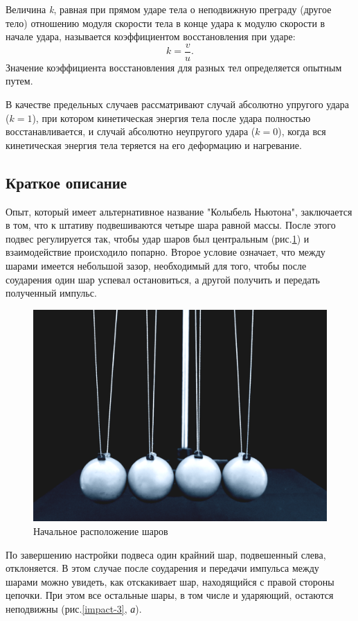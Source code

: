 \documentclass[All.tex]{subfiles}
\begin{document}
Величина \textit{k}, равная при прямом ударе тела о неподвижную преграду (другое тело) отношению модуля
скорости тела в конце удара к модулю скорости в начале удара, называется коэффициентом восстановления при ударе:
$$
k = \frac{v}{u}.
$$
Значение коэффициента восстановления для разных тел определяется опытным путем.

В качестве предельных случаев рассматривают случай абсолютно упругого удара ($ k=1 $), при котором кинетическая энергия тела после удара полностью восстанавливается, и случай абсолютно неупругого удара ($ k=0 $), когда вся кинетическая энергия тела теряется на его деформацию и нагревание.

\subsection*{\textcolor{PineGreen}{Краткое описание}}

Опыт, который имеет альтернативное название "Колыбель Ньютона", заключается в том, что к штативу подвешиваются четыре шара равной массы.
После этого подвес регулируется так, чтобы удар шаров был центральным (рис.\ref{impact-2}) и взаимодействие происходило попарно.
Второе условие означает, что между шарами имеется небольшой зазор, необходимый для того, чтобы после соударения один шар успевал остановиться, а другой получить и передать полученный импульс.
\begin{figure}[H]
	\centering 	
	\includegraphics[width=0.6\linewidth]{impact-2.png}
	\caption{Начальное расположение шаров}
	\label{impact-2}
\end{figure}

По завершению настройки подвеса один крайний шар, подвешенный слева, отклоняется.
В этом случае после соударения и передачи импульса между шарами можно увидеть, как отскакивает шар, находящийся с правой стороны цепочки.
При этом все остальные шары, в том числе и ударяющий, остаются неподвижны (рис.\ref{impact-3}, \textit{а}).
\end{document}
